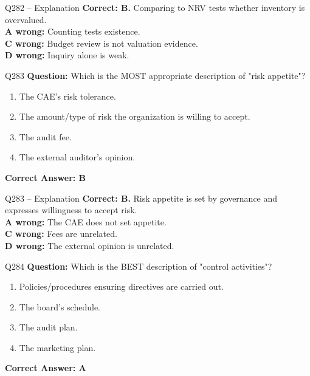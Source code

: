\documentclass[aspectratio=169,10pt]{beamer}
\begin{document}
	\begin{frame}[t]{Q282 -- Explanation}
		\small
		\textbf{Correct: B.} Comparing to NRV tests whether inventory is overvalued. \\[4pt]
		\textbf{A wrong:} Counting tests existence. \\[2pt]
		\textbf{C wrong:} Budget review is not valuation evidence. \\[2pt]
		\textbf{D wrong:} Inquiry alone is weak.
	\end{frame}
	
	\begin{frame}[t]{Q283}
		\small
		\textbf{Question:} Which is the MOST appropriate description of "risk appetite"?
		\begin{enumerate}[label=\Alph*.,itemsep=1pt,topsep=2pt]
			\item The CAE's risk tolerance.
			\item The amount/type of risk the organization is willing to accept.
			\item The audit fee.
			\item The external auditor's opinion.
		\end{enumerate}
		\vspace{4pt}
		\textbf{Correct Answer: B}
	\end{frame}
	
	\begin{frame}[t]{Q283 -- Explanation}
		\small
		\textbf{Correct: B.} Risk appetite is set by governance and expresses willingness to accept risk. \\[4pt]
		\textbf{A wrong:} The CAE does not set appetite. \\[2pt]
		\textbf{C wrong:} Fees are unrelated. \\[2pt]
		\textbf{D wrong:} The external opinion is unrelated.
	\end{frame}
	
	\begin{frame}[t]{Q284}
		\small
		\textbf{Question:} Which is the BEST description of "control activities"?
		\begin{enumerate}[label=\Alph*.,itemsep=1pt,topsep=2pt]
			\item Policies/procedures ensuring directives are carried out.
			\item The board's schedule.
			\item The audit plan.
			\item The marketing plan.
		\end{enumerate}
		\vspace{4pt}
		\textbf{Correct Answer: A}
	\end{frame}
	
\end{document}
